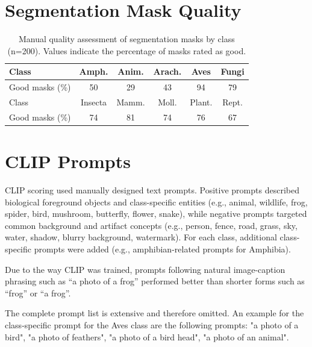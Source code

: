 \documentclass[sigconf, nonacm]{acmart}
\begin{document}




\appendix


\section{Segmentation Mask Quality}
\label{tab:mask-quality}
\begin{table}[h]
	\centering
	\caption{Manual quality assessment of segmentation masks by class (n=200). Values indicate the percentage of masks rated as good.}
	\small
	\begin{tabular}{lccccc}
		\toprule
		Class & Amph. & Anim. & Arach. & Aves & Fungi \\
		\midrule
		Good masks (\%) & 50 & 29 & 43 & 94 & 79 \\
		\midrule
		Class & Insecta & Mamm. & Moll. & Plant. & Rept. \\
		\midrule
		Good masks (\%) & 74 & 81 & 74 & 76 & 67 \\
		\bottomrule
	\end{tabular}
\end{table}


\section{CLIP Prompts}
\label{sec_clip}

CLIP scoring used manually designed text prompts. Positive prompts described biological foreground objects and class-specific entities (e.g., animal, wildlife, frog, spider, bird, mushroom, butterfly, flower, snake), while negative prompts targeted common background and artifact concepts (e.g., person, fence, road, grass, sky, water, shadow, blurry background, watermark).
For each class, additional class-specific prompts were added (e.g., amphibian-related prompts for Amphibia).

Due to the way CLIP was trained, prompts following natural image-caption phrasing such as ``a photo of a frog'' performed better than shorter forms such as ``frog'' or ``a frog''.

The complete prompt list is extensive and therefore omitted. An example for the class-specific prompt for the Aves class are the following prompts: "a photo of a bird", "a photo of feathers", "a photo of a bird head", "a photo of an animal". 
\end{document}
